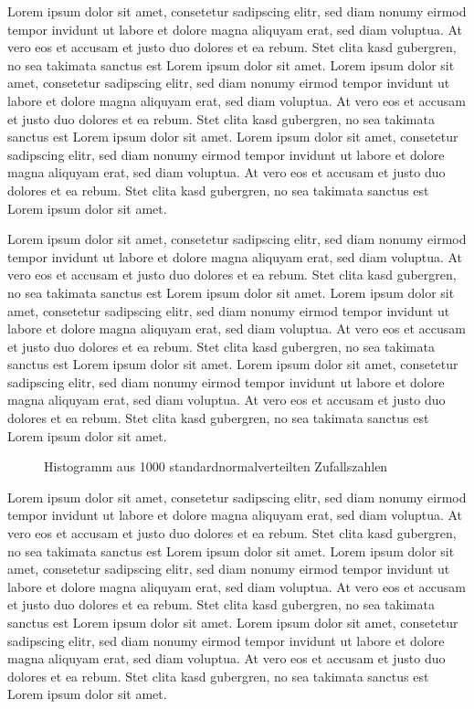 \documentclass[
  11pt,
  a4paper,
]{tudscrreprt}
\begin{document}
Lorem ipsum dolor sit amet, consetetur sadipscing elitr, sed diam nonumy
eirmod tempor invidunt ut labore et dolore magna aliquyam erat, sed diam
voluptua. At vero eos et accusam et justo duo dolores et ea rebum. Stet
clita kasd gubergren, no sea takimata sanctus est Lorem ipsum dolor sit
amet. Lorem ipsum dolor sit amet, consetetur sadipscing elitr, sed diam
nonumy eirmod tempor invidunt ut labore et dolore magna aliquyam erat,
sed diam voluptua. At vero eos et accusam et justo duo dolores et ea
rebum. Stet clita kasd gubergren, no sea takimata sanctus est Lorem
ipsum dolor sit amet. Lorem ipsum dolor sit amet, consetetur sadipscing
elitr, sed diam nonumy eirmod tempor invidunt ut labore et dolore magna
aliquyam erat, sed diam voluptua. At vero eos et accusam et justo duo
dolores et ea rebum. Stet clita kasd gubergren, no sea takimata sanctus
est Lorem ipsum dolor sit amet.

Lorem ipsum dolor sit amet, consetetur sadipscing elitr, sed diam nonumy
eirmod tempor invidunt ut labore et dolore magna aliquyam erat, sed diam
voluptua. At vero eos et accusam et justo duo dolores et ea rebum. Stet
clita kasd gubergren, no sea takimata sanctus est Lorem ipsum dolor sit
amet. Lorem ipsum dolor sit amet, consetetur sadipscing elitr, sed diam
nonumy eirmod tempor invidunt ut labore et dolore magna aliquyam erat,
sed diam voluptua. At vero eos et accusam et justo duo dolores et ea
rebum. Stet clita kasd gubergren, no sea takimata sanctus est Lorem
ipsum dolor sit amet. Lorem ipsum dolor sit amet, consetetur sadipscing
elitr, sed diam nonumy eirmod tempor invidunt ut labore et dolore magna
aliquyam erat, sed diam voluptua. At vero eos et accusam et justo duo
dolores et ea rebum. Stet clita kasd gubergren, no sea takimata sanctus
est Lorem ipsum dolor sit amet.

\begin{figure}


\caption[1000 Zufallszahlen]{\label{fig-histogram}Histogramm aus 1000
standardnormalverteilten Zufallszahlen}

\end{figure}%

Lorem ipsum dolor sit amet, consetetur sadipscing elitr, sed diam nonumy
eirmod tempor invidunt ut labore et dolore magna aliquyam erat, sed diam
voluptua. At vero eos et accusam et justo duo dolores et ea rebum. Stet
clita kasd gubergren, no sea takimata sanctus est Lorem ipsum dolor sit
amet. Lorem ipsum dolor sit amet, consetetur sadipscing elitr, sed diam
nonumy eirmod tempor invidunt ut labore et dolore magna aliquyam erat,
sed diam voluptua. At vero eos et accusam et justo duo dolores et ea
rebum. Stet clita kasd gubergren, no sea takimata sanctus est Lorem
ipsum dolor sit amet. Lorem ipsum dolor sit amet, consetetur sadipscing
elitr, sed diam nonumy eirmod tempor invidunt ut labore et dolore magna
aliquyam erat, sed diam voluptua. At vero eos et accusam et justo duo
dolores et ea rebum. Stet clita kasd gubergren, no sea takimata sanctus
est Lorem ipsum dolor sit amet.
\end{document}

